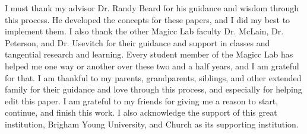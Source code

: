 \begin{acknowledgments}
    I must thank my advisor Dr. Randy Beard for his guidance and wisdom through this process. 
    He developed the concepts for these papers, and I did my best to implement them.
    I also thank the other Magicc Lab faculty Dr. McLain, Dr. Peterson, and Dr. Usevitch for their guidance and support in classes and tangential research and learning.
    Every student member of the Magicc Lab has helped me one way or another over these two and a half years, and I am grateful for that. 
    I am thankful to my parents, grandparents, siblings, and other extended family for their guidance and love through this process, and especially for helping edit this paper.
    I am grateful to my friends for giving me a reason to start, continue, and finish this work. 
    I also acknowledge the support of this great institution, Brigham Young University, and Church as its supporting institution.
\end{acknowledgments}
